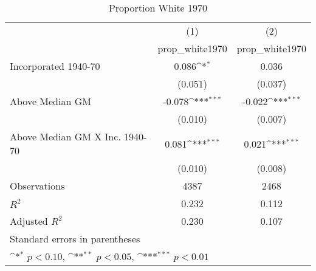 \begin{table}[htbp]\centering
\def\sym#1{\ifmmode^{#1}\else\(^{#1}\)\fi}
\caption{Proportion White 1970}
\begin{tabular}{l*{2}{c}}
\hline\hline
                    &\multicolumn{1}{c}{(1)}&\multicolumn{1}{c}{(2)}\\
                    &\multicolumn{1}{c}{prop\_white1970}&\multicolumn{1}{c}{prop\_white1970}\\
\hline
Incorporated 1940-70&       0.086\sym{*}  &       0.036         \\
                    &     (0.051)         &     (0.037)         \\
[1em]
Above Median GM     &      -0.078\sym{***}&      -0.022\sym{***}\\
                    &     (0.010)         &     (0.007)         \\
[1em]
Above Median GM X Inc. 1940-70&       0.081\sym{***}&       0.021\sym{***}\\
                    &     (0.010)         &     (0.008)         \\
\hline
Observations        &        4387         &        2468         \\
\(R^{2}\)           &       0.232         &       0.112         \\
Adjusted \(R^{2}\)  &       0.230         &       0.107         \\
\hline\hline
\multicolumn{3}{l}{\footnotesize Standard errors in parentheses}\\
\multicolumn{3}{l}{\footnotesize \sym{*} \(p<0.10\), \sym{**} \(p<0.05\), \sym{***} \(p<0.01\)}\\
\end{tabular}
\end{table}
